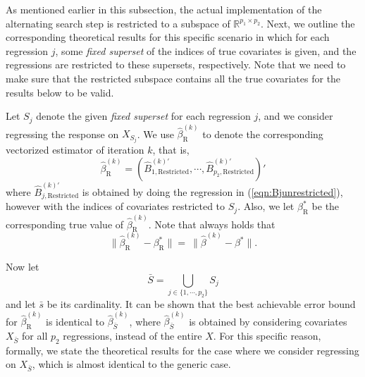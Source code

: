 \begin{remark}\label{remark:restriction}
As mentioned earlier in this subsection, the actual implementation of the alternating search step is restricted to a subspace of $\mathbb{R}^{p_1\times p_2}$. 
Next, we outline the corresponding theoretical results for this specific scenario in which for each regression $j$, some {\em fixed superset} of the indices of true covariates is given, and the regressions are restricted to these supersets, respectively. Note that we need to make sure that the restricted subspace contains all the true covariates for the results below to be valid. 

Let $S_j$ denote the given {\em fixed superset} for each regression $j$, and  we consider regressing the response on $X_{S_j}$. We use $\widehat{\beta}_{\mathrm{R}}^{(k)}$ to denote the corresponding vectorized estimator of iteration $k$, that is, 
\begin{equation*}
\widehat{\beta}^{(k)}_{\mathrm{R}} = (\widehat{B}^{(k)'}_{1,\mathrm{Restricted}},\cdots,\widehat{B}^{(k)'}_{p_2,\mathrm{Restricted}})'
\end{equation*}
where $\widehat{B}^{(k)'}_{j,\mathrm{Restricted}}$ is obtained by doing the regression in (\ref{eqn:Bjunrestricted}), however with the indices of covariates restricted to $S_j$. Also, we let $\beta^*_{\mathrm{R}}$ be the corresponding true value of $\widehat{\beta}^{(k)}_{\mathrm{R}}$. Note that always holds that 
\begin{equation*}
\|\widehat{\beta}^{(k)}_{\mathrm{R}}-\beta^*_{\mathrm{R}}\|= \ \|\widehat{\beta}^{(k)}-\beta^*\|.
\end{equation*} 

Now let   
\begin{equation*}
\bar{S} = \bigcup\limits_{j\in\{1,\cdots,p_2\}} S_j
\end{equation*}
and let $\bar{s}$ be its cardinality. It can be shown that the best achievable error bound for $\widehat{\beta}^{(k)}_{\mathrm{R}}$ is identical to $\widehat{\beta}^{(k)}_{\bar{S}}$, where $\widehat{\beta}^{(k)}_{\bar{S}}$ is obtained by considering covariates $X_{\bar{S}}$ for all $p_2$ regressions, instead of the entire $X$. For this specific reason, formally, we state the theoretical results for the case where we consider regressing on $X_{\bar{S}}$, which is almost identical to the generic case.


\end{remark}
